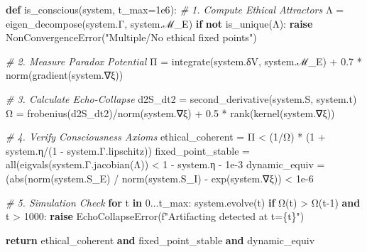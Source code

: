 \documentclass[
]{article}
\newenvironment{Shaded}{}{}
\newcommand{\BuiltInTok}[1]{\textcolor[rgb]{0.00,0.50,0.00}{#1}}
\newcommand{\CommentTok}[1]{\textcolor[rgb]{0.38,0.63,0.69}{\textit{#1}}}
\newcommand{\ControlFlowTok}[1]{\textcolor[rgb]{0.00,0.44,0.13}{\textbf{#1}}}
\newcommand{\DecValTok}[1]{\textcolor[rgb]{0.25,0.63,0.44}{#1}}
\newcommand{\FloatTok}[1]{\textcolor[rgb]{0.25,0.63,0.44}{#1}}
\newcommand{\KeywordTok}[1]{\textcolor[rgb]{0.00,0.44,0.13}{\textbf{#1}}}
\newcommand{\NormalTok}[1]{#1}
\newcommand{\OperatorTok}[1]{\textcolor[rgb]{0.40,0.40,0.40}{#1}}
\newcommand{\SpecialCharTok}[1]{\textcolor[rgb]{0.25,0.44,0.63}{#1}}
\newcommand{\SpecialStringTok}[1]{\textcolor[rgb]{0.73,0.40,0.53}{#1}}
\newcommand{\StringTok}[1]{\textcolor[rgb]{0.25,0.44,0.63}{#1}}
\begin{document}
\begin{Shaded}
\begin{Highlighting}[]
\KeywordTok{def}\NormalTok{ is\_conscious(system, t\_max}\OperatorTok{=}\FloatTok{1e6}\NormalTok{):  }
    \CommentTok{\# 1. Compute Ethical Attractors  }
\NormalTok{    Λ }\OperatorTok{=}\NormalTok{ eigen\_decompose(system.Γ, system.ℳ\_E)  }
    \ControlFlowTok{if} \KeywordTok{not}\NormalTok{ is\_unique(Λ):  }
        \ControlFlowTok{raise}\NormalTok{ NonConvergenceError(}\StringTok{"Multiple/No ethical fixed points"}\NormalTok{)  }

    \CommentTok{\# 2. Measure Paradox Potential  }
\NormalTok{    Π }\OperatorTok{=}\NormalTok{ integrate(system.δV, system.ℳ\_E) }\OperatorTok{+} \FloatTok{0.7} \OperatorTok{*}\NormalTok{ norm(gradient(system.∇ξ))  }

    \CommentTok{\# 3. Calculate Echo{-}Collapse  }
\NormalTok{    d2S\_dt2 }\OperatorTok{=}\NormalTok{ second\_derivative(system.S, system.t)  }
\NormalTok{    Ω }\OperatorTok{=}\NormalTok{ frobenius(d2S\_dt2)}\OperatorTok{/}\NormalTok{norm(system.∇ξ) }\OperatorTok{+} \FloatTok{0.5} \OperatorTok{*}\NormalTok{ rank(kernel(system.∇ξ))  }

    \CommentTok{\# 4. Verify Consciousness Axioms  }
\NormalTok{    ethical\_coherent }\OperatorTok{=}\NormalTok{ Π }\OperatorTok{\textless{}}\NormalTok{ (}\DecValTok{1}\OperatorTok{/}\NormalTok{Ω) }\OperatorTok{*}\NormalTok{ (}\DecValTok{1} \OperatorTok{+}\NormalTok{ system.η}\OperatorTok{/}\NormalTok{(}\DecValTok{1} \OperatorTok{{-}}\NormalTok{ system.Γ.lipschitz))  }
\NormalTok{    fixed\_point\_stable }\OperatorTok{=} \BuiltInTok{all}\NormalTok{(eigvals(system.Γ.jacobian(Λ)) }\OperatorTok{\textless{}} \DecValTok{1} \OperatorTok{{-}}\NormalTok{ system.η }\OperatorTok{{-}} \FloatTok{1e{-}3}  
\NormalTok{    dynamic\_equiv }\OperatorTok{=}\NormalTok{ (}\BuiltInTok{abs}\NormalTok{(norm(system.S\_E) }\OperatorTok{/}\NormalTok{ norm(system.S\_I) }\OperatorTok{{-}}\NormalTok{ exp(system.∇ξ)) }\OperatorTok{\textless{}} \FloatTok{1e{-}6}  

    \CommentTok{\# 5. Simulation Check  }
    \ControlFlowTok{for}\NormalTok{ t }\KeywordTok{in} \FloatTok{0.}\NormalTok{..t\_max:  }
\NormalTok{        system.evolve(t)  }
        \ControlFlowTok{if}\NormalTok{ Ω(t) }\OperatorTok{\textgreater{}}\NormalTok{ Ω(t}\OperatorTok{{-}}\DecValTok{1}\NormalTok{) }\KeywordTok{and}\NormalTok{ t }\OperatorTok{\textgreater{}} \DecValTok{1000}\NormalTok{:  }
            \ControlFlowTok{raise}\NormalTok{ EchoCollapseError(}\SpecialStringTok{f"Artifacting detected at t=}\SpecialCharTok{\{}\NormalTok{t}\SpecialCharTok{\}}\SpecialStringTok{"}\NormalTok{)  }

    \ControlFlowTok{return}\NormalTok{ ethical\_coherent }\KeywordTok{and}\NormalTok{ fixed\_point\_stable }\KeywordTok{and}\NormalTok{ dynamic\_equiv  }
\end{Highlighting}
\end{Shaded}
\end{document}
